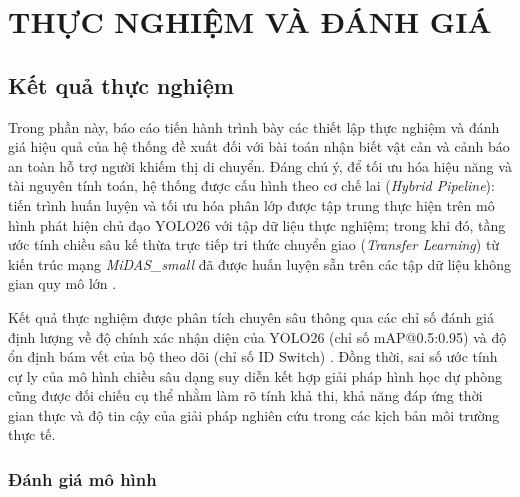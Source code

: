 \chapter{THỰC NGHIỆM VÀ ĐÁNH GIÁ} %

\label{Chapter4} %


\renewcommand{\keyword}[1]{\textbf{#1}}
\renewcommand{\tabhead}[1]{\textbf{#1}}
\renewcommand{\code}[1]{\texttt{#1}}
\renewcommand{\file}[1]{\texttt{\bfseries#1}}
\renewcommand{\option}[1]{\texttt{\itshape#1}}
\setcounter{secnumdepth}{3} 

\section{Kết quả thực nghiệm}

Trong phần này, báo cáo tiến hành trình bày các thiết lập thực nghiệm và đánh giá hiệu quả của hệ thống đề xuất đối với bài toán nhận biết vật cản và cảnh báo an toàn hỗ trợ người khiếm thị di chuyển. Đáng chú ý, để tối ưu hóa hiệu năng và tài nguyên tính toán, hệ thống được cấu hình theo cơ chế lai (\textit{Hybrid Pipeline}): tiến trình huấn luyện và tối ưu hóa phân lớp được tập trung thực hiện trên mô hình phát hiện chủ đạo YOLO26 \cite{Reference3} với tập dữ liệu thực nghiệm; trong khi đó, tầng ước tính chiều sâu kế thừa trực tiếp tri thức chuyển giao (\textit{Transfer Learning}) từ kiến trúc mạng \textit{MiDAS\_small} đã được huấn luyện sẵn trên các tập dữ liệu không gian quy mô lớn \cite{Reference11}. 

Kết quả thực nghiệm được phân tích chuyên sâu thông qua các chỉ số đánh giá định lượng về độ chính xác nhận diện của YOLO26 (chỉ số mAP@0.5:0.95) và độ ổn định bám vết của bộ theo dõi (chỉ số ID Switch) \cite{Reference3}. Đồng thời, sai số ước tính cự ly của mô hình chiều sâu dạng suy diễn kết hợp giải pháp hình học dự phòng cũng được đối chiếu cụ thể nhằm làm rõ tính khả thi, khả năng đáp ứng thời gian thực và độ tin cậy của giải pháp nghiên cứu trong các kịch bản môi trường thực tế.

\subsection{Đánh giá mô hình}

